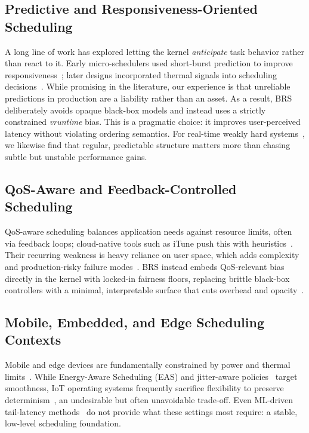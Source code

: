 \subsection{Predictive and Responsiveness-Oriented Scheduling}
A long line of work has explored letting the kernel \emph{anticipate} task behavior rather than react to it. Early micro-schedulers used short-burst prediction to improve responsiveness~\cite{4663063}; later designs incorporated thermal signals into scheduling decisions~\cite{6365626}. While promising in the literature, our experience is that unreliable predictions in production are a liability rather than an asset. As a result, BRS deliberately avoids opaque black-box models and instead uses a strictly constrained \textit{vruntime} bias. This is a pragmatic choice: it improves user-perceived latency without violating ordering semantics. For real-time weakly hard systems~\cite{9351534}, we likewise find that regular, predictable structure matters more than chasing subtle but unstable performance gains.

\subsection{QoS-Aware and Feedback-Controlled Scheduling}
QoS-aware scheduling balances application needs against resource limits, often via feedback loops; cloud-native tools such as iTune push this with heuristics~\cite{5580094,5169938}. Their recurring weakness is heavy reliance on user space, which adds complexity and production-risky failure modes~\cite{7792746,6782279,8758850}. BRS instead embeds QoS-relevant bias directly in the kernel with locked-in fairness floors, replacing brittle black-box controllers with a minimal, interpretable surface that cuts overhead and opacity~\cite{7426385,8338088}.

\subsection{Mobile, Embedded, and Edge Scheduling Contexts}
Mobile and edge devices are fundamentally constrained by power and thermal limits~\cite{1244943}. While Energy-Aware Scheduling (EAS) and jitter-aware policies~\cite{9121657} target smoothness, IoT operating systems frequently sacrifice flexibility to preserve determinism~\cite{10007654,9999639}, an undesirable but often unavoidable trade-off. Even ML-driven tail-latency methods~\cite{Zhang2025Tail} do not provide what these settings most require: a stable, low-level scheduling foundation.

